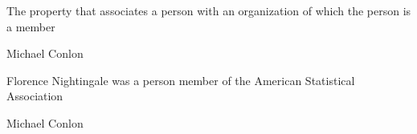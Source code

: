 \documentclass[letterpaper,10pt,english]{sphinxmanual}
\begin{document}
\begin{sphinxShadowBox}

\sphinxAtStartPar
{}
\end{sphinxShadowBox}

\begin{sphinxShadowBox}

\sphinxAtStartPar
The property that associates a person with an organization of which the person is a member
\end{sphinxShadowBox}

\begin{sphinxShadowBox}

\sphinxAtStartPar
Michael Conlon 
\end{sphinxShadowBox}

\begin{sphinxShadowBox}

\sphinxAtStartPar
{\hyperref[\detokenize{doc-NCBITaxon_9606::doc}]{}}
\end{sphinxShadowBox}

\begin{sphinxShadowBox}

\sphinxAtStartPar
{\hyperref[\detokenize{doc-ORG_0000001::doc}]{}}
\end{sphinxShadowBox}

\begin{sphinxShadowBox}

\sphinxAtStartPar
Florence Nightingale was a person member of the American Statistical Association
\end{sphinxShadowBox}

\begin{sphinxShadowBox}

\sphinxAtStartPar
Michael Conlon 
\end{sphinxShadowBox}
\begin{quote}

\ignorespaces \end{quote}
\end{document}
